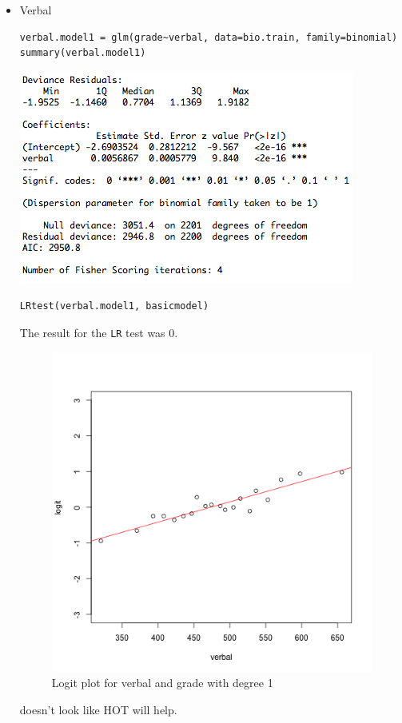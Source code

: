 \documentclass[11pt]{article}
\begin{document}
\begin{enumerate}
\begin{enumerate}
\begin{itemize}
		\item Verbal
\begin{Verbatim}
verbal.model1 = glm(grade~verbal, data=bio.train, family=binomial)
summary(verbal.model1)
\end{Verbatim}
		\begin{center}
			\includegraphics[scale=0.7]{verbal_model}
		\end{center}
\begin{Verbatim}
LRtest(verbal.model1, basicmodel)
\end{Verbatim}
	The result for the \verb|LR| test was 0.


			\begin{figure}[H]
				\caption{Logit plot for verbal and grade with degree 1}
				\begin{center}
					\includegraphics[scale=0.25]{grade_verbal_logit}
				\end{center}
			\end{figure}
          doesn't look like HOT will help. 


\end{itemize}
\end{enumerate}
\end{enumerate}
\end{document}
